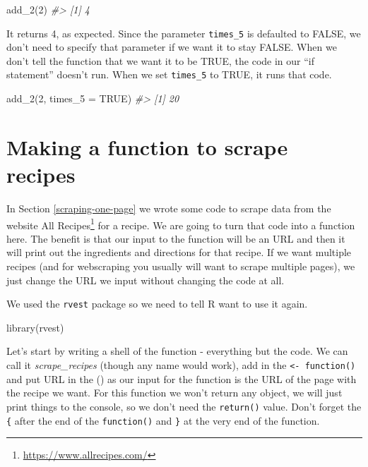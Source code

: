 \documentclass[
]{krantz}
\makeatletter
\newenvironment{Shaded}{\begin{snugshade}}{\end{snugshade}}
\newcommand{\AttributeTok}[1]{\textcolor[rgb]{0.61,0.61,0.61}{#1}}
\newcommand{\CommentTok}[1]{\textcolor[rgb]{0.37,0.37,0.37}{\textit{#1}}}
\newcommand{\ConstantTok}[1]{\textcolor[rgb]{0,0,0}{#1}}
\newcommand{\DecValTok}[1]{\textcolor[rgb]{0.06,0.06,0.06}{#1}}
\newcommand{\FunctionTok}[1]{\textcolor[rgb]{0,0,0}{#1}}
\newcommand{\NormalTok}[1]{#1}
\renewcommand{\href}[2]{#2\footnote{\url{#1}}}
\newenvironment{kframe}{%
\medskip{}
\setlength{\fboxsep}{.8em}
 \def\at@end@of@kframe{}%
 \ifinner\ifhmode%
  \def\at@end@of@kframe{\end{minipage}}%
  \begin{minipage}{\columnwidth}%
 \fi\fi%
 \def\FrameCommand##1{\hskip\@totalleftmargin \hskip-\fboxsep
 \colorbox{shadecolor}{##1}\hskip-\fboxsep
     \hskip-\linewidth \hskip-\@totalleftmargin \hskip\columnwidth}%
 \MakeFramed {\advance\hsize-\width
   \@totalleftmargin\z@ \linewidth\hsize
   \@setminipage}}%
 {\par\unskip\endMakeFramed%
 \at@end@of@kframe}
\renewenvironment{Shaded}{\begin{kframe}}{\end{kframe}}
\makeatother
\begin{document}
\begin{Shaded}
\begin{Highlighting}[]
\FunctionTok{add\_2}\NormalTok{(}\DecValTok{2}\NormalTok{)}
\CommentTok{\#\textgreater{} [1] 4}
\end{Highlighting}
\end{Shaded}

It returns 4, as expected. Since the parameter
\texttt{times\_5} is defaulted to FALSE, we don't need to
specify that parameter if we want it to stay FALSE. When we
don't tell the function that we want it to be TRUE, the code
in our ``if statement'' doesn't run. When we set
\texttt{times\_5} to TRUE, it runs that code.

\begin{Shaded}
\begin{Highlighting}[]
\FunctionTok{add\_2}\NormalTok{(}\DecValTok{2}\NormalTok{, }\AttributeTok{times\_5 =} \ConstantTok{TRUE}\NormalTok{)}
\CommentTok{\#\textgreater{} [1] 20}
\end{Highlighting}
\end{Shaded}

\hypertarget{recipes-function}{%
\section{Making a function to scrape
recipes}\label{recipes-function}}

In Section \ref{scraping-one-page} we wrote some code to
scrape data from the website
\href{https://www.allrecipes.com/}{All Recipes} for a
recipe. We are going to turn that code into a function here.
The benefit is that our input to the function will be an URL
and then it will print out the ingredients and directions
for that recipe. If we want multiple recipes (and for
webscraping you usually will want to scrape multiple pages),
we just change the URL we input without changing the code at
all.

We used the \texttt{rvest} package so we need to tell R want
to use it again.

\begin{Shaded}
\begin{Highlighting}[]
\FunctionTok{library}\NormalTok{(rvest)}
\end{Highlighting}
\end{Shaded}

Let's start by writing a shell of the function - everything
but the code. We can call it \emph{scrape\_recipes} (though
any name would work), add in the
\texttt{\textless{}-\ function()} and put URL in the () as
our input for the function is the URL of the page with the
recipe we want. For this function we won't return any
object, we will just print things to the console, so we
don't need the \texttt{return()} value. Don't forget the
\texttt{\{} after the end of the \texttt{function()} and
\texttt{\}} at the very end of the function.
\end{document}
